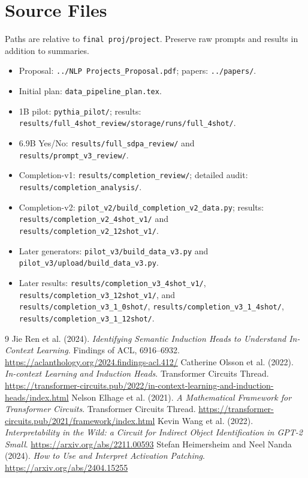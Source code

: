 \documentclass[11pt,a4paper]{article}
\newcommand{\file}[1]{\nolinkurl{#1}}
\begin{document}
\section{Source Files}
Paths are relative to \texttt{final proj/project}. Preserve raw prompts and results in addition to summaries.
\begin{itemize}
\item Proposal: \file{../NLP Projects_Proposal.pdf}; papers: \file{../papers/}.
\item Initial plan: \file{data_pipeline_plan.tex}.
\item 1B pilot: \file{pythia_pilot/}; results: \file{results/full_4shot_review/storage/runs/full_4shot/}.
\item 6.9B Yes/No: \file{results/full_sdpa_review/} and \file{results/prompt_v3_review/}.
\item Completion-v1: \file{results/completion_review/}; detailed audit: \file{results/completion_analysis/}.
\item Completion-v2: \file{pilot_v2/build_completion_v2_data.py}; results: \file{results/completion_v2_4shot_v1/} and \file{results/completion_v2_12shot_v1/}.
\item Later generators: \file{pilot_v3/build_data_v3.py} and \file{pilot_v3/upload/build_data_v3.py}.
\item Later results: \file{results/completion_v3_4shot_v1/}, \file{results/completion_v3_12shot_v1/}, and \file{results/completion_v3_1_0shot/}, \file{results/completion_v3_1_4shot/}, \file{results/completion_v3_1_12shot/}.
\end{itemize}

\begin{thebibliography}{9}
 Jie Ren et al. (2024). \emph{Identifying Semantic Induction Heads to Understand In-Context Learning}. Findings of ACL, 6916--6932. \url{https://aclanthology.org/2024.findings-acl.412/}
 Catherine Olsson et al. (2022). \emph{In-context Learning and Induction Heads}. Transformer Circuits Thread. \url{https://transformer-circuits.pub/2022/in-context-learning-and-induction-heads/index.html}
 Nelson Elhage et al. (2021). \emph{A Mathematical Framework for Transformer Circuits}. Transformer Circuits Thread. \url{https://transformer-circuits.pub/2021/framework/index.html}
 Kevin Wang et al. (2022). \emph{Interpretability in the Wild: a Circuit for Indirect Object Identification in GPT-2 Small}. \url{https://arxiv.org/abs/2211.00593}
 Stefan Heimersheim and Neel Nanda (2024). \emph{How to Use and Interpret Activation Patching}. \url{https://arxiv.org/abs/2404.15255}
\end{thebibliography}
\end{document}
